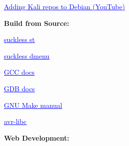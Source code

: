 \documentclass[
  english,
  paper=a4,
  oneside  ,captions=tableheading
]{scrartcl}
\begin{document}
%
  \par\vspace{0.5ex}%
  \href{https://youtu.be/YI1Q3R0TEYs?si=TO3KfOz4nq0sSIVw}{\textcolor{blue}{\underline{\faLink\quad Adding Kali repos to Debian (YouTube)}}}%
  \par\vspace{0.5ex}%

\textbf{Build from Source:}

%
  \par\vspace{0.5ex}%
  \href{https://suckless.org/st/}{\textcolor{blue}{\underline{\faLink\quad suckless st}}}%
  \par\vspace{0.5ex}%

%
  \par\vspace{0.5ex}%
  \href{https://suckless.org/dmenu/}{\textcolor{blue}{\underline{\faLink\quad suckless dmenu}}}%
  \par\vspace{0.5ex}%

%
  \par\vspace{0.5ex}%
  \href{https://gcc.gnu.org/onlinedocs/}{\textcolor{blue}{\underline{\faLink\quad GCC docs}}}%
  \par\vspace{0.5ex}%

%
  \par\vspace{0.5ex}%
  \href{https://www.gnu.org/software/gdb/documentation/}{\textcolor{blue}{\underline{\faLink\quad GDB docs}}}%
  \par\vspace{0.5ex}%

%
  \par\vspace{0.5ex}%
  \href{https://www.gnu.org/software/make/manual/}{\textcolor{blue}{\underline{\faLink\quad GNU Make manual}}}%
  \par\vspace{0.5ex}%

%
  \par\vspace{0.5ex}%
  \href{https://www.nongnu.org/avr-libc/}{\textcolor{blue}{\underline{\faLink\quad avr-libc}}}%
  \par\vspace{0.5ex}%

\textbf{Web Development:}
\end{document}
